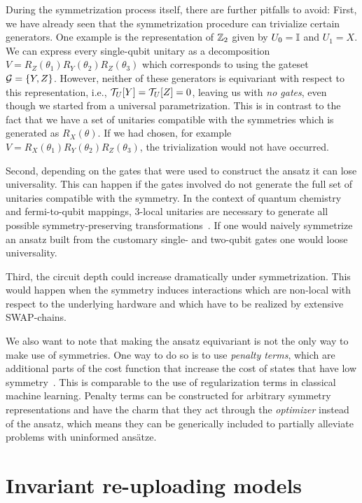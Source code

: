 \documentclass[a4paper,twocolumn,notitlepage,nofootinbib,superscriptaddress,floatfix]{revtex4-2}
\begin{document}
During the symmetrization process itself, there are further pitfalls to avoid:
First, we have already seen that the symmetrization procedure can trivialize certain generators. One example is the representation of $\mathbb{Z}_2$ given by $U_0 = \mathbb{I}$ and $U_1 = X$. We can express every single-qubit unitary as a decomposition $V = R_Z(\theta_1) R_Y(\theta_2) R_Z(\theta_3)$ which corresponds to using the gateset $\mathcal{G} = \{ Y, Z \}$. However, neither of these generators is equivariant with respect to this representation, i.e., $\mathcal{T}_U[Y] = \mathcal{T}_U[Z] = 0$, leaving us with \emph{no gates}, even though we started from a universal parametrization. This is in contrast to the fact that we have a set of unitaries compatible with the symmetries which is generated as $R_X(\theta)$. If we had chosen, for example $V =R_X(\theta_1) R_Y(\theta_2) R_Z(\theta_3)$, the trivialization would not have occurred.

Second, depending on the gates that were used to construct the ansatz it can lose universality. This can happen if the gates involved do not generate the full set of unitaries compatible with the symmetry. In the context of quantum chemistry and fermi-to-qubit mappings, 3-local unitaries are necessary to generate all possible symmetry-preserving transformations~\cite{arrazola2021universal,oszmaniec2017universal}. If one would naively symmetrize an ansatz built from the customary single- and two-qubit gates one would loose universality. 

Third, the circuit depth could increase dramatically under symmetrization. This would happen when the symmetry induces interactions which are non-local with respect to the underlying hardware and which have to be realized by extensive SWAP-chains. 

We also want to note that making the ansatz equivariant is not the only way to make use of symmetries. One way to do so is to use \emph{penalty terms}, which are additional parts of the cost function that increase the cost of states that have low symmetry~\cite{kuroiwa2021penalty,ryabinkin2018symmetry,yen2019exact}. This is comparable to the use of regularization terms in classical machine learning. Penalty terms can be constructed for arbitrary symmetry representations and have the charm that they act through the \emph{optimizer} instead of the ansatz, which means they can be generically included to partially alleviate problems with uninformed ansätze.

\section{Invariant re-uploading models}\label{sec:invariant_models}
\end{document}
